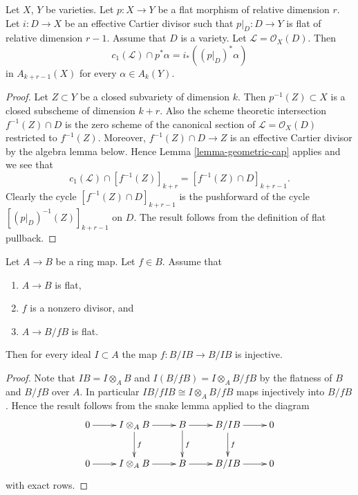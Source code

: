 \begin{lemma}
\label{lemma-relative-effective-cartier}
Let $X$, $Y$ be varieties.
Let $p : X \to Y$ be a flat morphism of relative dimension $r$.
Let $i : D \to X$ be an effective Cartier divisor such that
$p|_D : D \to Y$ is flat of relative dimension $r - 1$. Assume that
$D$ is a variety. Let $\mathcal{L} = \mathcal{O}_X(D)$.
Then
$$
c_1(\mathcal{L}) \cap p^*\alpha = i_* ((p|_D)^*\alpha)
$$
in $A_{k + r - 1}(X)$ for every $\alpha \in A_k(Y)$.
\end{lemma}

\begin{proof}
Let $Z \subset Y$ be a closed subvariety of dimension $k$.
Then $p^{-1}(Z) \subset X$ is a closed subscheme of dimension
$k + r$. Also the scheme theoretic intersection $f^{-1}(Z) \cap D$ is
the zero scheme of the canonical section of $\mathcal{L} = \mathcal{O}_X(D)$
restricted to $f^{-1}(Z)$. Moreover, $f^{-1}(Z) \cap D \to Z$ is an
effective Cartier divisor by the algebra lemma below. Hence
Lemma \ref{lemma-geometric-cap} applies and we see that
$$
c_1(\mathcal{L}) \cap [f^{-1}(Z)]_{k + r} =
[f^{-1}(Z) \cap D]_{k + r - 1}.
$$
Clearly the cycle $[f^{-1}(Z) \cap D]_{k + r - 1}$ is the
pushforward of the cycle $[(p|_D)^{-1}(Z)]_{k + r - 1}$ on $D$.
The result follows from the definition of flat pullback.
\end{proof}

\begin{lemma}
\label{lemma-relative-effective-cartier-algebra}
Let $A \to B$ be a ring map. Let $f \in B$. Assume that
\begin{enumerate}
\item $A \to B$ is flat,
\item $f$ is a nonzero divisor, and
\item $A \to B/fB$ is flat.
\end{enumerate}
Then for every ideal $I \subset A$ the map
$f : B/IB \to B/IB$ is injective.
\end{lemma}

\begin{proof}
Note that $IB = I \otimes_A B$ and $I(B/fB) = I\otimes_A B/fB$
by the flatness of $B$ and $B/fB$ over $A$.
In particular $IB/fIB \cong I \otimes_A B/fB$ maps injectively
into $B/fB$. Hence the result follows from the snake lemma applied
to the diagram
$$
\xymatrix{
0 \ar[r] &
I \otimes_A B \ar[r] \ar[d]^f &
B \ar[r] \ar[d]^f &
B/IB \ar[r] \ar[d]^f &
0 \\
0 \ar[r] &
I \otimes_A B \ar[r] &
B \ar[r] &
B/IB \ar[r] &
0
}
$$
with exact rows.
\end{proof}




